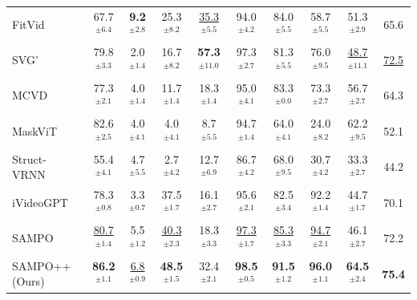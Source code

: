 \begin{table}[t]
{\begin{tabular}{lcccccccc|c}
        \midrule
        FitVid~\cite{babaeizadeh2021fitvid} & 67.7$^{\pm 6.4}$ & \textbf{9.2$^{\pm 2.8}$} & 25.3$^{\pm 8.2}$ & \underline{35.3}$^{\pm 5.5}$ & 94.0$^{\pm 4.2}$ & 84.0$^{\pm 5.5}$ & 58.7$^{\pm 5.5}$ & 51.3$^{\pm 2.9}$ & 65.6 \\
        SVG'~\cite{villegas2019high} & 79.8$^{\pm 3.3}$  & 2.0$^{\pm 1.4}$ & 16.7$^{\pm 8.2}$ & \textbf{57.3}$^{\pm 11.0}$ & 97.3$^{\pm 2.7}$ & 81.3$^{\pm 5.5}$ & 76.0$^{\pm 9.5}$ & \underline{48.7}$^{\pm 11.1}$ & \underline{72.5} \\
        MCVD~\cite{voleti2022mcvd} & 77.3$^{\pm 2.1}$ & 4.0$^{\pm 1.4}$ & 11.7$^{\pm 1.4}$ & 18.3$^{\pm 1.4}$ & 95.0$^{\pm 4.1}$ & 83.3$^{\pm 0.0}$ & 73.3$^{\pm 2.7}$ & 56.7$^{\pm 2.7}$ & 64.3 \\
        MaskViT~\cite{gupta2022maskvit} & 82.6$^{\pm 2.5}$ & 4.0$^{\pm 4.1}$ & 4.0$^{\pm 4.1}$ & 8.7$^{\pm 5.5}$ & 94.7$^{\pm 1.4}$ & 64.0$^{\pm 4.1}$ & 24.0$^{\pm 8.2}$ & 62.2$^{\pm 9.5}$ & 52.1 \\
        Struct-VRNN~\cite{minderer2019unsupervised} & 55.4$^{\pm 4.1}$ & 4.7$^{\pm 5.5}$ & 2.7$^{\pm 4.2}$ & 12.7$^{\pm 6.9}$ & 86.7$^{\pm 4.2}$ & 68.0$^{\pm 9.5}$ & 30.7$^{\pm 4.2}$ & 33.3$^{\pm 2.7}$ & 44.2 \\
        iVideoGPT~\cite{wu2024ivideogpt} & 78.3$^{\pm 0.8}$ & 3.3$^{\pm 0.7}$ & 37.5$^{\pm 1.7}$ & 16.1$^{\pm 2.7}$ & 95.6$^{\pm 2.1}$ & 82.5$^{\pm 3.4}$ & 92.2$^{\pm 1.4}$ & 44.7$^{\pm 1.7}$ & 70.1 \\
        
        SAMPO~\cite{wang2025sampo} & \multicolumn{1}{c}{\underline{80.7}$^{\pm 1.4}$} & \multicolumn{1}{c}{5.5$^{\pm 1.2}$} & \multicolumn{1}{c}{\underline{40.3}$^{\pm 2.3}$} & \multicolumn{1}{c}{18.3$^{\pm 3.3}$} & \multicolumn{1}{c}{\underline{97.3}$^{\pm 1.7}$} & \multicolumn{1}{c}{\underline{85.3}$^{\pm 3.3}$} & \multicolumn{1}{c}{\underline{94.7}$^{\pm 2.1}$} & \multicolumn{1}{c|}{46.1$^{\pm 2.7}$} & \multicolumn{1}{c}{72.2} \\ 
        \midrule
        \rowcolor{blue!10} SAMPO++ (Ours) & \multicolumn{1}{c}{\textbf{86.2}$^{\pm 1.1}$} & \multicolumn{1}{c}{\underline{6.8}$^{\pm 0.9}$} & \multicolumn{1}{c}{\textbf{48.5}$^{\pm 1.5}$} & \multicolumn{1}{c}{32.4$^{\pm 2.1}$} & \multicolumn{1}{c}{\textbf{98.5}$^{\pm 0.5}$} & \multicolumn{1}{c}{\textbf{91.5}$^{\pm 1.2}$} & \multicolumn{1}{c}{\textbf{96.0}$^{\pm 1.1}$} & \multicolumn{1}{c|}{\textbf{64.5}$^{\pm 2.4}$} & \multicolumn{1}{c}{\textbf{75.4}} \\ \bottomrule

    \end{tabular}
    }
    \vspace{-3ex}
\end{table}